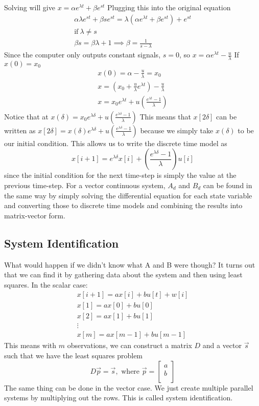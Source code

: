 \documentclass{article}
\begin{document}
Solving will give $x=\alpha e^{\lambda t}+\beta e^{st}$
Plugging this into the original equation
\[
    \begin{array}{c}
        \alpha \lambda e^{st}+\beta se^{st} = \lambda (\alpha e^{\lambda t}+\beta e^{st})+e^{st}\\
        \text{if}\> \lambda \ne s\\
        \beta s = \beta \lambda + 1 \implies \beta = \frac{1}{s-\lambda}
    \end{array}
    \]
Since the computer only outputs constant signals, $s=0$, so $x=\alpha e^{\lambda t}-\frac{u}{\lambda}$
If $x(0)=x_0$
\[
    \begin{array}{c}
        x(0)=\alpha - \frac{u}{\lambda}=x_0\\
        x = (x_0+\frac{u}{\lambda}e^{\lambda t})-\frac{u}{\lambda}\\
        x = x_0 e^{\lambda t}+u\left(
            \frac{e^{\lambda t}-1}{\lambda}
        \right)
    \end{array}
\]
Notice that at $x(\delta) = x_0 e^{\lambda \delta}+u\left(\frac{e^{\lambda \delta}-1}{\lambda}\right)$
This means that $x[2\delta]$ can be written as $x[2\delta] = x(\delta) e^{\lambda \delta}+u\left(\frac{e^{\lambda \delta}-1}{\lambda}\right)$
because we simply take $x(\delta)$ to be our initial condition.
This allows us to write the discrete time model as
$$x[i+1]=e^{\lambda \delta}x[i]+\left(
    \frac{e^{\lambda \delta}-1}{\lambda}\right) u[i]$$
since the initial condition for the next time-step is simply the value at the previous time-step.
For a vector continuous system, $A_d$ and $B_d$ can be found in the same way by simply solving
the differential equation for each state variable and converting those to discrete time models
and combining the results into matrix-vector form.

\subsection{System Identification}
What would happen if we didn't know what A and B were though? It turns out that we can find it by gathering data about the system and then using least squares.
In the scalar case:
\[
    \begin{array}{c}
        x[i+1]=ax[i]+bu[t]+w[i]\\
        x[1]=ax[0]+bu[0]\\
        x[2]=ax[1]+bu[1]\\
        \vdots\\
        x[m]=ax[m-1]+bu[m-1]
    \end{array}
\]
This means with $m$ observations, we can construct a matrix $D$ and a vector $\vec{s}$ such that we have the least squares problem
\[
    D\vec{p}=\vec{s},\text{ where } \vec{p}=
\left[
    \begin{array}{c}
        a\\
        b\\
    \end{array}
\right]
\]
The same thing can be done in the vector case. We just create multiple parallel systems by multiplying out the rows.
This is called system identification.
\end{document}
